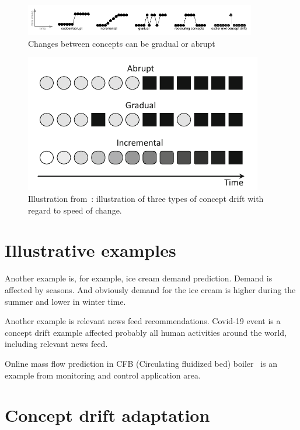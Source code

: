 \begin{figure}[htb!]
	\centering
	\includegraphics[width=0.9\textwidth]{images/images_cropped/gama_survey_cd_fig2}
  \caption{Changes between concepts can be gradual or abrupt~\cite{gama2014survey}}\label{fig:fig2_gama_survey_cd}
\end{figure}


\begin{figure}[htb!]
	\centering
	\includegraphics[height=0.15\textheight]{images/images_cropped/krop_souza_cd_speed}
	\caption{Illustration from~\cite{SouzaChallenges2020}: illustration of three types of concept drift with regard to speed of change.}\label{fig:souza_cd_speeds}
\end{figure}


\section{Illustrative examples}

Another example is, for example, ice cream demand prediction.
Demand is affected by seasons.
And obviously demand for the ice cream is higher during the summer and lower in winter time.

Another example is relevant news feed recommendations.
Covid-19 event is a concept drift example affected probably all human activities around the world, including relevant news feed.

Online mass flow prediction in CFB (Circulating fluidized bed) boiler~\cite{pechenizkiy2010online} is an example from monitoring and control application area.


\section{Concept drift adaptation}

